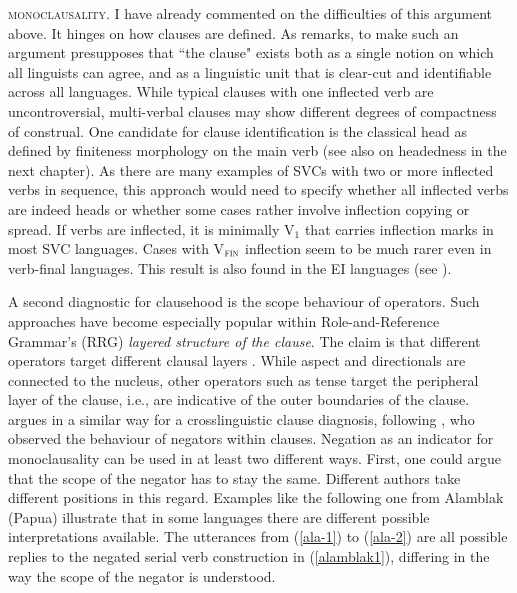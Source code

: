 \textsc{monoclausality}. I have already commented on the difficulties of this argument above. It hinges on how clauses are defined. As \citet[26]{lane2008kalam} remarks, to make such an argument presupposes that ``the clause" exists both as a single notion on which all linguists can agree, and as a linguistic unit that is clear-cut and identifiable across all languages. While typical clauses with one inflected verb are uncontroversial, multi-verbal clauses may show different degrees of compactness of construal. One candidate for clause identification is the classical head as defined by finiteness morphology on the main verb (see also  on headedness in the next chapter). As there are many examples of SVCs with two or more inflected verbs in sequence, this approach would need to specify whether all inflected verbs are indeed heads or whether some cases rather involve inflection copying or spread. If verbs are inflected, it is minimally V$_1$ that carries inflection marks in most SVC languages. Cases with V$_{\textsc{fin}}$ inflection seem to be much rarer even in verb-final languages. This result is also found in the EI languages (see ).

A second diagnostic for clausehood is the scope behaviour of operators. Such approaches have become especially popular within Role-and-Reference Grammar's (RRG) \textit{layered structure of the clause}. The claim is that different operators target different clausal layers \citep{foley1984functional}. While aspect and directionals are connected to the nucleus, other operators such as tense target the peripheral layer of the clause, i.e., are indicative of the outer boundaries of the clause. \citet{haspelmath2016serial} argues in a similar way for a crosslinguistic clause diagnosis, following \citet{bohnemeyer2007principles}, who observed the behaviour of negators within clauses. Negation as an indicator for monoclausality can be used in at least two different ways. First, one could argue that the scope of the negator has to stay the same. Different authors take different positions in this regard. Examples like the following one from Alamblak (Papua) illustrate that in some languages there are different possible interpretations available. The utterances from (\ref{ala-1}) to (\ref{ala-2}) are all possible replies to the negated serial verb construction in (\ref{alamblak1}), differing in the way the scope of the negator is understood.

